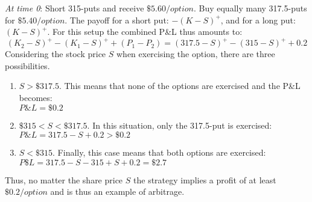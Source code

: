 \documentclass{article}
\begin{document}
\textit{At time 0}: Short 315-puts and receive $\$5.60 / option$. Buy equally many 317.5-puts for $\$5.40/option$.
The payoff for a short put: $-(K-S)^+$, and for a long put: $(K-S)^+$. For this setup the combined P\&L thus amounts to:
$$(K_2-S)^+ -(K_1-S)^+ + (P_1 - P_2) = (317.5-S)^+ - (315-S)^+ + 0.2$$
Considering the stock price $S$ when exercising the option, there are three possibilities.
\begin{enumerate}
	\item $S > \$317.5$. This means that none of the options are exercised and the P\&L becomes: \\ $P\&L = \$0.2$
	\item $\$315 < S < \$317.5$. In this situation, only the 317.5-put is exercised: \\ $P\&L = 317.5 - S + 0.2 > \$0.2$
	\item $S < \$315$. Finally, this case means that both options are exercised: \\$P\$L = 317.5 - S - 315 + S + 0.2 = \$2.7$
\end{enumerate}
Thus, no matter the share price $S$ the strategy implies a profit of at least $\$0.2/option$ and is thus an example of arbitrage.
\end{document}
